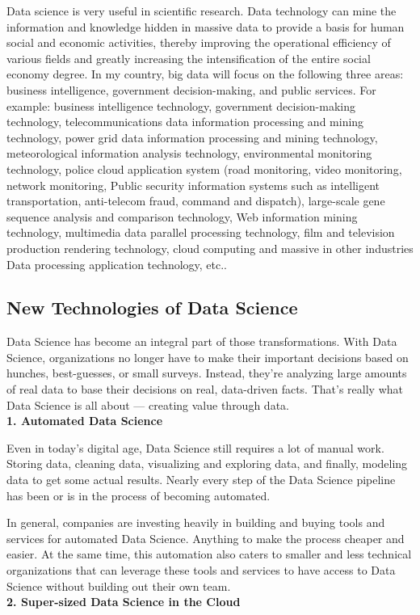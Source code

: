 \documentclass[a4paper, 11pt,twoside=true]{scrartcl}
\begin{document}
\quad Data science is very useful in scientific research. Data technology can mine the information and knowledge hidden in massive data to provide a basis for human social and economic activities, thereby improving the operational efficiency of various fields and greatly increasing the intensification of the entire social economy degree. In my country, big data will focus on the following three areas: business intelligence, government decision-making, and public services. For example: business intelligence technology, government decision-making technology, telecommunications data information processing and mining technology, power grid data information processing and mining technology, meteorological information analysis technology, environmental monitoring technology, police cloud application system (road monitoring, video monitoring, network monitoring, Public security information systems such as intelligent transportation, anti-telecom fraud, command and dispatch), large-scale gene sequence analysis and comparison technology, Web information mining technology, multimedia data parallel processing technology, film and television production rendering technology, cloud computing and massive in other industries Data processing application technology, etc..

\subsection{New Technologies of Data Science}
\qquad Data Science has become an integral part of those transformations. With Data Science, organizations no longer have to make their important decisions based on hunches, best-guesses, or small surveys. Instead, they’re analyzing large amounts of real data to base their decisions on real, data-driven facts. That’s really what Data Science is all about — creating value through data.\\
\textbf{1. Automated Data Science}

\quad Even in today’s digital age, Data Science still requires a lot of manual work. Storing data, cleaning data, visualizing and exploring data, and finally, modeling data to get some actual results. Nearly every step of the Data Science pipeline has been or is in the process of becoming automated. 

\quad In general, companies are investing heavily in building and buying tools and services for automated Data Science. Anything to make the process cheaper and easier. At the same time, this automation also caters to smaller and less technical organizations that can leverage these tools and services to have access to Data Science without building out their own team.\\
\textbf{2. Super-sized Data Science in the Cloud}
\end{document}
